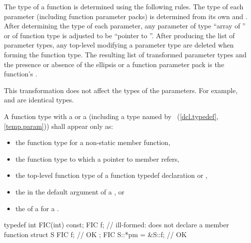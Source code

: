 \pnum
{}%
The type of a function is determined using the following rules.
The type of each parameter (including function parameter packs) is
determined from its own
and
.
After determining the type of each parameter, any parameter
%
of type ``array of '' or
%
of function type 
is adjusted to be ``pointer to ''.
After producing the list of parameter types,
any top-level
modifying a parameter type are deleted
when forming the function type.
The resulting list of transformed parameter types
and the presence or absence of the ellipsis or a function parameter pack
is the function's
.
\begin{note}
This transformation does not affect the types of the parameters.
For example,  and
 are identical types.
\end{note}

\pnum
A function type with a  or a
 (including a type named by
~(\ref{dcl.typedef}, \ref{temp.param}))
shall appear only as:
\begin{itemize}
\item the function type for a non-static member function,

\item the function type to which a pointer to member refers,

\item the top-level function type of a function typedef declaration
or ,

\item the  in the default argument of a
, or

\item the  of a  for a
.
\end{itemize}
\begin{example}
\begin{codeblock}
typedef int FIC(int) const;
FIC f;              // ill-formed: does not declare a member function
struct S {
  FIC f;            // OK
};
FIC S::*pm = &S::f; // OK
\end{codeblock}
\end{example}

